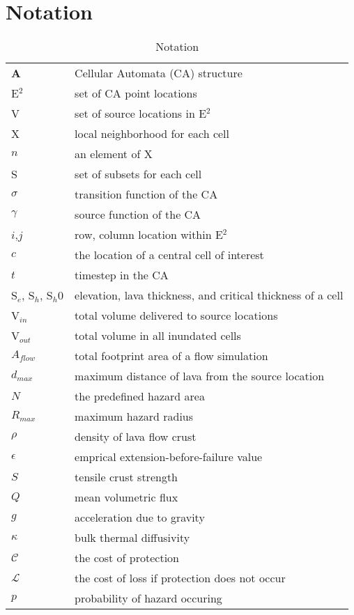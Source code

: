 \section{Notation}
	\begin{table}[h!]
		\centering
		\caption{Notation}
		\begin{tabular}{l l}
			\toprule
			\textbf{A}& Cellular Automata (CA) structure\\
			E$^2$& set of CA point locations\\
			V & set of source locations in E$^2$\\
			X & local neighborhood for each cell\\
			$n$ & an element of X\\
			S & set of subsets for each cell\\
			$\sigma$ & transition function of the CA\\
			$\gamma$ & source function of the CA\\
			$i$,$j$ & row, column location within E$^2$\\
			$c$ & the location of a central cell of interest\\
			$t$ & timestep in the CA\\
			S$_e$, S$_h$, S$_h0$ & elevation, lava thickness, and critical thickness of a cell\\
			V$_{in}$ & total volume delivered to source locations\\
			V$_{out}$ & total volume in all inundated cells\\
			$A_{flow}$ & total footprint area of a flow simulation\\
			$d_{max}$ & maximum distance of lava from the source location\\
			$N$ & the predefined hazard area\\
			$R_{max}$ & maximum hazard radius\\
			$\rho$ & density of lava flow crust\\
			$\epsilon$ & emprical extension-before-failure value\\
			$S$ & tensile crust strength\\
			$Q$ & mean volumetric flux\\
			$g$ & acceleration due to gravity\\
			$\kappa$ & bulk thermal diffusivity\\
			$\mathcal{C}$ & the cost of protection\\
			$\mathcal{L}$ & the cost of loss if protection does not occur\\
			$p$ & probability of hazard occuring\\
			\bottomrule
		\end{tabular}
		\label{tab_notation}
	\end{table}

